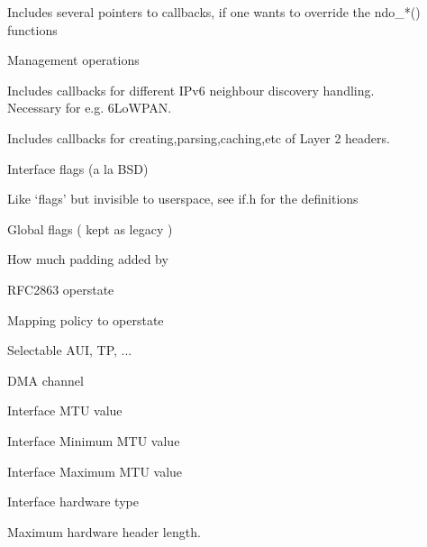 \documentclass[a4paper,8pt,english]{sphinxmanual}
\begin{document}
\begin{description}
\item[{}] \leavevmode
Includes several pointers to callbacks,
if one wants to override the ndo\_*() functions

\item[{}] \leavevmode
Management operations

\item[{}] \leavevmode
Includes callbacks for different IPv6 neighbour
discovery handling. Necessary for e.g. 6LoWPAN.

\item[{}] \leavevmode
Includes callbacks for creating,parsing,caching,etc
of Layer 2 headers.

\item[{}] \leavevmode
Interface flags (a la BSD)

\item[{}] \leavevmode
Like `flags' but invisible to userspace,
see if.h for the definitions

\item[{}] \leavevmode
Global flags ( kept as legacy )

\item[{}] \leavevmode
How much padding added by 

\item[{}] \leavevmode
RFC2863 operstate

\item[{}] \leavevmode
Mapping policy to operstate

\item[{}] \leavevmode
Selectable AUI, TP, ...

\item[{}] \leavevmode
DMA channel

\item[{}] \leavevmode
Interface MTU value

\item[{}] \leavevmode
Interface Minimum MTU value

\item[{}] \leavevmode
Interface Maximum MTU value

\item[{}] \leavevmode
Interface hardware type

\item[{}] \leavevmode
Maximum hardware header length.


\end{description}
\end{document}
